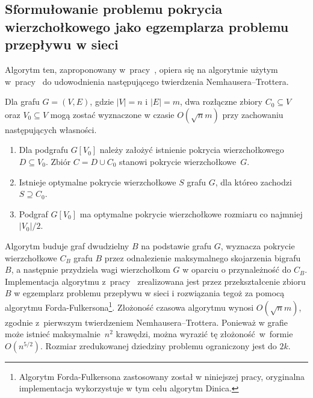 \subsection{Sformułowanie problemu pokrycia wierzchołkowego jako egzemplarza problemu przepływu w sieci}\label{Kernelization_network_flow}
Algorytm ten, zaproponowany w~pracy~\cite{KernelizationAlgorithms04}, opiera się na
algorytmie użytym w~pracy~\cite{Niedermeier02} do udowodnienia następującego twierdzenia
Nemhausera--Trottera.

\begin{theorem}
  Dla grafu $G=(V,E)$, gdzie $|V|=n$ i $|E|=m$, dwa rozłączne zbiory $C_0 \subseteq V$ oraz $V_0 \subseteq V$ mogą zostać wyznaczone w czasie $O(\sqrt{n}m)$ przy zachowaniu następujących własności.
  \begin{enumerate}
    \item Dla podgrafu $G[V_0]$ należy założyć istnienie pokrycia wierzchołkowego $D \subseteq V_0$.
    Zbiór $C = D \cup C_0$ stanowi pokrycie wierzchołkowe~$G$.
    \item Istnieje optymalne pokrycie wierzchołkowe $S$ grafu $G$, dla któreo zachodzi $S \supseteq C_0$.
    \item Podgraf $G[V_0]$ ma optymalne pokrycie wierzchołkowe rozmiaru co najmniej $|V_0|/2$. 
  \end{enumerate}
\end{theorem}

Algorytm buduje graf dwudzielny $B$ na podstawie grafu $G$, wyznacza pokrycie wierzchołkowe $C_B$ grafu $B$ przez odnalezienie maksymalnego skojarzenia bigrafu $B$,
a następnie przydziela wagi wierzchołkom $G$ w oparciu o przynależność do $C_B$.
Implementacja algorytmu z~pracy~\cite{Niedermeier02} zrealizowana jest przez
przekształcenie zbioru $B$ w egzemplarz problemu przepływu w sieci i rozwiązania tegoż za pomocą algorytmu Forda-Fulkersona\footnote{Algorytm Forda-Fulkersona
  zastosowany został w niniejszej pracy, oryginalna implementacja wykorzystuje w tym celu algorytm Dinica.}.
Złożoność czasowa algorytmu wynosi $O(\sqrt{n}m)$, zgodnie z~pierwszym twierdzeniem Nemhausera--Trottera. 
Ponieważ w grafie może istnieć maksymalnie~$n^2$ krawędzi, można wyrazić tę złożoność~w~formie $O(n^{5/2})$.
Rozmiar zredukowanej dziedziny problemu ograniczony jest do $2k$.

